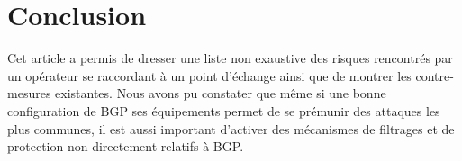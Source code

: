 








\section{Conclusion}

Cet article a permis de dresser une liste non exaustive des risques rencontrés par un opérateur se raccordant à un point d'échange ainsi que de montrer les contre-mesures existantes.
Nous avons pu constater que même si une bonne configuration de BGP ses équipements permet de se prémunir des attaques les plus communes, il est aussi important d'activer des mécanismes de filtrages et de protection non directement relatifs à BGP.

